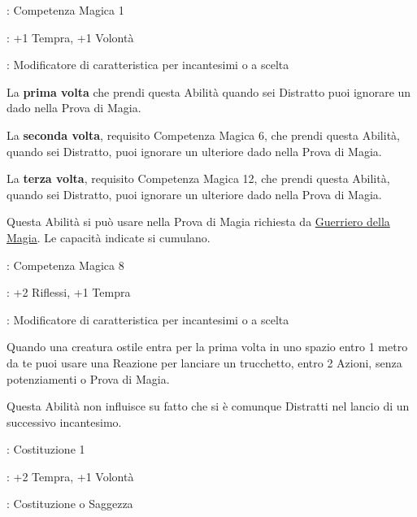 \begin{multicols}{2}
\begin{description}[noitemsep, topsep=0pt, parsep=0pt, partopsep=0pt, leftmargin=0cm, labelwidth=2.5cm]
    \item[\textbf{Requisito}]: Competenza Magica 1
    \item[\textbf{Tiri Salvezza}]: +1 Tempra, +1 Volontà
    \item[\textbf{Caratteristica}]: Modificatore di caratteristica per incantesimi o a scelta
\end{description}

La \textbf{prima volta} che prendi questa Abilità quando sei Distratto puoi ignorare un dado nella Prova di Magia.

La \textbf{seconda volta}, requisito Competenza Magica 6, che prendi questa Abilità, quando sei Distratto, puoi ignorare un ulteriore dado nella Prova di Magia.

La \textbf{terza volta}, requisito Competenza Magica 12, che prendi questa Abilità, quando sei Distratto, puoi ignorare un ulteriore dado nella Prova di Magia.

Questa Abilità si può usare nella Prova di Magia richiesta da \hyperlink{guerrierodellamagia}{Guerriero della Magia}. Le capacità indicate si cumulano.

\begin{description}[noitemsep, topsep=0pt, parsep=0pt, partopsep=0pt, leftmargin=0cm, labelwidth=2.5cm]
    \item[\textbf{Requisito}]: Competenza Magica 8
    \item[\textbf{Tiri Salvezza}]: +2 Riflessi, +1 Tempra
    \item[\textbf{Caratteristica}]: Modificatore di caratteristica per incantesimi o a scelta
\end{description}

Quando una creatura ostile entra per la prima volta in uno spazio entro 1 metro da te puoi usare una Reazione per lanciare un trucchetto, entro 2 Azioni, senza potenziamenti o Prova di Magia.

Questa Abilità non influisce su fatto che si è comunque Distratti nel lancio di un successivo incantesimo.

\begin{description}[noitemsep, topsep=0pt, parsep=0pt, partopsep=0pt, leftmargin=0cm, labelwidth=2.5cm]
    \item[\textbf{Requisito}]: Costituzione 1
    \item[\textbf{Tiri Salvezza}]: +2 Tempra, +1 Volontà
    \item[\textbf{Caratteristica}]: Costituzione o Saggezza
\end{description}


\end{multicols}
